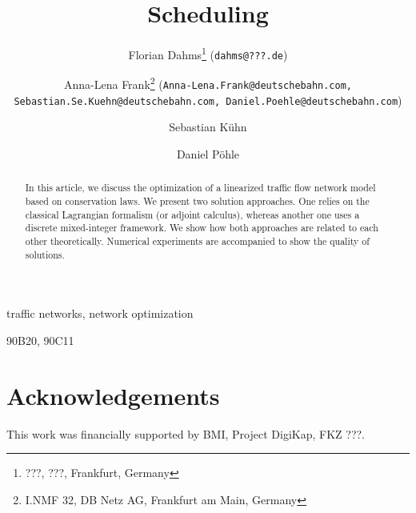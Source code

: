 \documentclass[final]{siamltex}
\title{Scheduling}
\author{
Florian Dahms\thanks{???, ???, Frankfurt, Germany} ({\tt dahms@???.de})
\and Anna-Lena Frank\thanks{I.NMF 32, DB Netz AG, Frankfurt am Main, Germany} ({\tt Anna-Lena.Frank@deutschebahn.com, Sebastian.Se.Kuehn@deutschebahn.com, Daniel.Poehle@deutschebahn.com})
\and Sebastian K\"uhn\footnotemark[2]
\and Daniel P\"ohle\footnotemark[2]}
\numberwithin{equation}{section}
\begin{document}
\maketitle

\begin{abstract} %
In this article, we discuss the optimization of
a linearized traffic flow network model based on conservation laws.
We present two solution approaches. One relies on the classical Lagrangian formalism
(or adjoint calculus), whereas another one uses a discrete mixed-integer framework.
We show how both approaches are related to each other theoretically.
Numerical experiments are accompanied to show the quality of solutions.
\end{abstract}

\begin{keywords}
traffic networks, network optimization
\end{keywords}

\begin{AMS}
90B20, 90C11
\end{AMS}

\pagestyle{myheadings}
\thispagestyle{plain}













%

\section*{Acknowledgements}
This work was financially supported by BMI, Project DigiKap, FKZ ???.

%



\end{document}
